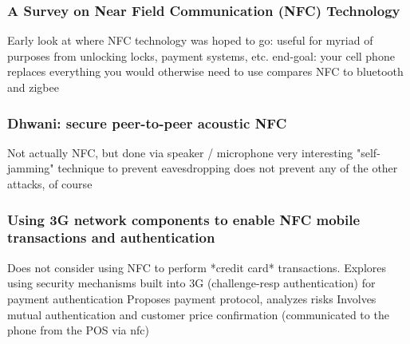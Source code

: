 \subsubsection*{A Survey on Near Field Communication (NFC) Technology}
\cite{Coskun2013}
Early look at where NFC technology was hoped to go:
useful for myriad of purposes from unlocking locks, payment systems, etc.
end-goal: your cell phone replaces everything you would otherwise need to use
compares NFC to bluetooth and zigbee

\subsubsection*{Dhwani: secure peer-to-peer acoustic NFC}
\cite{nandakumar2013dhwani}
Not actually NFC, but done via speaker / microphone
very interesting "self-jamming" technique to prevent eavesdropping
does not prevent any of the other attacks, of course

\subsubsection*{Using 3G network components to enable NFC mobile transactions and authentication}
\cite{chen2010using}
Does not consider using NFC to perform *credit card* transactions.
Explores using security mechanisms built into 3G (challenge-resp authentication) for payment authentication
Proposes payment protocol, analyzes risks
Involves mutual authentication and customer price confirmation (communicated to the phone from the POS via nfc)
